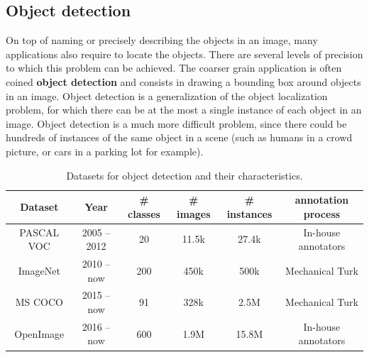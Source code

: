 \subsection{Object detection}

On top of naming or precisely describing the objects in an image, many applications also require to locate the objects. There are several levels of precision to which this problem can be achieved. The coarser grain application is often coined \textbf{object detection} and consists in drawing a bounding box around objects in an image. Object detection is a generalization of the object localization problem, for which there can be at the most a single instance of each object in an image. Object detection is a much more difficult problem, since there could be hundreds of instances of the same object in a scene (such as humans in a crowd picture, or cars in a parking lot for example).

\vspace{0.5cm}

\begin{table}
	\centering
	\caption{Datasets for object detection and their characteristics.}
	\begin{tabular}{|c|c|c|c|c|c|}
		\hline
		Dataset & Year & \# classes & \# images & \# instances & annotation process \\
		\hline
		PASCAL VOC \cite{Everingham10} & 2005 -- 2012 & 20 & 11.5k & 27.4k & In-house annotators \\
		ImageNet\cite{ILSVRC15} & 2010 -- now & 200 & 450k & 500k & Mechanical Turk \\
		MS COCO \cite{lin2014microsoft} & 2015 -- now & 91 & 328k & 2.5M & Mechanical Turk \\
		OpenImage \cite{OpenImages, OpenImages2} & 2016 -- now & 600 & 1.9M & 15.8M & In-house annotators \\
		\hline
	\end{tabular}
	\label{tab:detection_ds}
\end{table}

